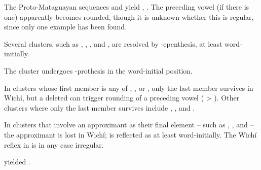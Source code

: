 The Proto-Mataguayan sequences  and  yield , . The preceding vowel (if there is one) apparently becomes rounded, though it is unknown whether this is regular, since only one example has been found.

\begin{exe}
    \ex \bite
    \ex \earkfe
    \ex \tornkf
    \ex \frighten
\end{exe}

Several clusters, such as , , , and , are resolved by \mbox{-}epenthesis, at least word-initially.

\begin{exe}
    \ex \suncho
    \ex \palm
    \ex \mesh
    \ex \wildcat
    \ex \blind
\end{exe}

The cluster  undergoes \mbox{-}prothesis in the word-initial position.

\begin{exe}
    \ex \whitequebracho
    \ex \kingvulture
    \ex \cardon
    \ex \chachalaca
\end{exe}

In clusters whose first member is any of , , or , only the last member survives in Wichí, but a deleted  can trigger rounding of a preceding vowel ( > ). Other clusters where only the last member survives include , , and .

\begin{exe}
    \ex \elbow
    \ex \spouse
    \ex \flu
    \ex \majan
    \ex \cavy
    \ex \tooth
    \ex \belly
    \ex \metal
    \ex \femalebreast
\end{exe}

In clusters that involve an approximant as their final element -- such as , , and  -- the approximant is lost in Wichí;  is reflected as  at least word-initially. The Wichí reflex in  is in any case irregular.

\begin{exe}
    \ex \smelln
    \ex \cavy
    \ex \kingvulture \label{wi-stw-kingvulture}
    \ex \anteater
\end{exe}

 yielded .

